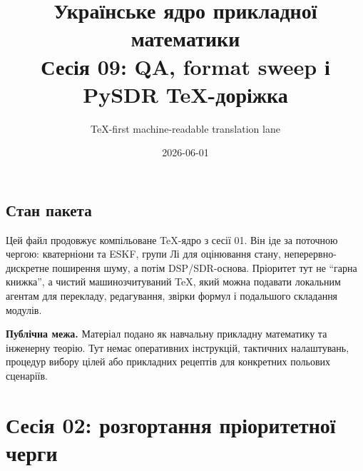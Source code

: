 \documentclass[11pt,a4paper,oneside]{book}
\title{Українське ядро прикладної математики\\\large Сесія 09: QA, format sweep і PySDR TeX-доріжка}
\author{TeX-first machine-readable translation lane}
\date{2026-06-01}
\begin{document}
\pagestyle{plain}
\frontmatter
\maketitle

\chapter*{Стан пакета}
Цей файл продовжує компільоване TeX-ядро з сесії 01. Він іде за поточною чергою: кватерніони та ESKF, групи Лі для оцінювання стану, неперервно-дискретне поширення шуму, а потім DSP/SDR-основа. Пріоритет тут не ``гарна книжка'', а чистий машинозчитуваний TeX, який можна подавати локальним агентам для перекладу, редагування, звірки формул і подальшого складання модулів.

\medskip
\noindent\textbf{Публічна межа.} Матеріал подано як навчальну прикладну математику та інженерну теорію. Тут немає оперативних інструкцій, тактичних налаштувань, процедур вибору цілей або прикладних рецептів для конкретних польових сценаріїв.

\tableofcontents

\mainmatter









\part{Сесія 02: розгортання пріоритетної черги}

















\end{document}
